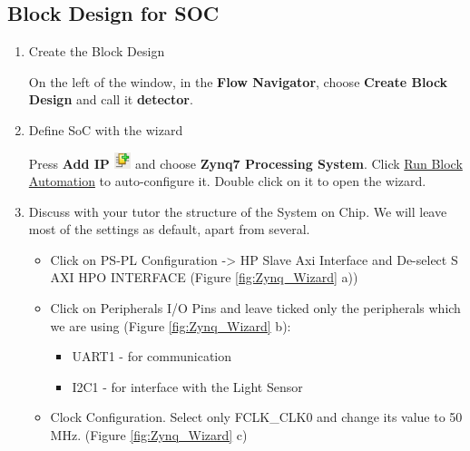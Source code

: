 \documentclass{article}
\begin{document}
\subsection{Block Design for SOC}

\begin{enumerate}


\item Create the Block Design

On the left of the window, in the \textbf{Flow Navigator}, choose \textbf{Create Block Design} and call it \textbf{detector}. 




\item Define SoC with the wizard

Press \textbf{Add IP} \includegraphics[width = 0.5cm]{img/icon_add.png} and choose \textbf{Zynq7 Processing System}. Click {\color{blue}\underline{Run Block Automation}} to auto-configure it. Double click on it to open the wizard.

\item Discuss with your tutor the structure of the System on Chip. We will leave most of the settings as default, apart from several.

\begin{itemize}
    \item Click on PS-PL Configuration -> HP Slave Axi Interface and De-select S AXI HPO INTERFACE (Figure \ref{fig:Zynq_Wizard} a))
    \item Click on Peripherals I/O Pins and leave ticked only the peripherals which we are using (Figure \ref{fig:Zynq_Wizard} b):
    
        \begin{itemize}
            \item UART1 - for communication
            \item I2C1 - for interface with the Light Sensor
        \end{itemize}
    \item Clock Configuration. Select only FCLK\_CLK0 and change its value to 50 MHz. (Figure \ref{fig:Zynq_Wizard} c)
\end{itemize}


\end{enumerate}
\end{document}
